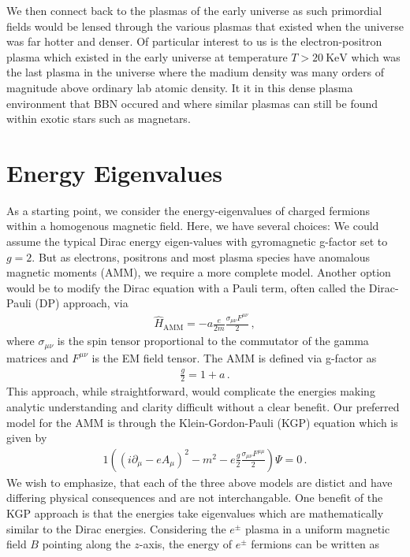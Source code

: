 \documentclass[Universe,article,submit,moreauthors,pdftex]{Definitions/mdpi}
\begin{document}
We then connect back to the plasmas of the early universe as such primordial fields would be lensed through the various plasmas that existed when the universe was far hotter and denser. Of particular interest to us is the electron-positron plasma which existed in the early universe at temperature $T>20\ \mathrm{KeV}$ which was the last plasma in the universe where the madium density was many orders of magnitude above ordinary lab atomic density. It it in this dense plasma environment that BBN occured and where similar plasmas can still be found within exotic stars such as magnetars.
\section{Energy Eigenvalues}\label{sec:energy}
\noindent As a starting point, we consider the energy-eigenvalues of charged fermions within a homogenous magnetic field. Here, we have several choices: We could assume the typical Dirac energy eigen-values with gyromagnetic g-factor set to $g=2$. But as electrons, positrons and most plasma species have anomalous magnetic moments (AMM), we require a more complete model. Another option would be to modify the Dirac equation with a Pauli term, often called the Dirac-Pauli (DP) approach, via
\begin{align}
  \label{Pauli} \hat{H}_{\mathrm{AMM}} = -a\frac{e}{2m}\frac{\sigma_{\mu\nu}F^{\mu\nu}}{2}\,,
\end{align}
where $\sigma_{\mu\nu}$ is the spin tensor proportional to the commutator of the gamma matrices and $F^{\mu\nu}$ is the EM field tensor. The AMM is defined via g-factor as
\begin{align}
  \label{Pauli} \frac{g}{2}=1+a\,.
\end{align}
This approach, while straightforward, would complicate the energies making analytic understanding and clarity difficult without a clear benefit. Our preferred model for the AMM is through the Klein-Gordon-Pauli (KGP) equation which is given by
\begin{alignat}{1}
  \label{KGP} \left(\left(i\partial_{\mu}-eA_{\mu}\right)^{2}-m^{2}-e\frac{g}{2}\frac{\sigma_{\mu\nu}F^{\mu\mu}}{2}\right)\Psi=0\,.
\end{alignat}
We wish to emphasize, that each of the three above models are distict and have differing physical consequences and are not interchangable. One benefit of the KGP approach is that the energies take eigenvalues which are mathematically similar to the Dirac energies. Considering the $e^\pm$ plasma in a uniform magnetic field $B$ pointing along the $z$-axis, the energy of $e^\pm$ fermions can be written as
\end{document}
